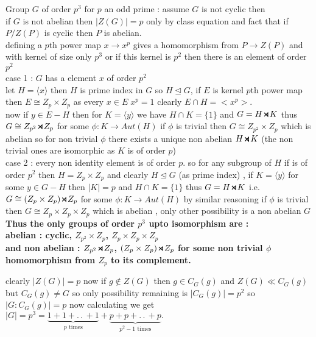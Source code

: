 \documentclass[11pt]{extarticle}
\newcommand{\ra}{\rightarrow}
\newcommand{\w}[1]{\text{#1}}
\newcommand{\ck}{.\,.\,}
\newcommand{\smdp}{ \,
\begin{tikzpicture}
	\draw[thick] (0,0)--(1ex,1ex)--(1ex,0)--(0,1ex);
\end{tikzpicture} 
\,
}
\newcommand{\gen}[1]{\langle #1 \rangle}
\newcommand{\tbx}[2][]{
	\begin{tcolorbox}[enhanced,breakable,size=small,colback=black!2!white,title={#1},arc is angular, arc=1.5mm,drop fuzzy shadow]
		#2
	\end{tcolorbox}
}
\begin{document}
\begin{multicols}{2}
	
	\tbx{ Group $ G $ of order $ p^3 $ for $ p $ an odd prime : 
		assume $ G $ is not cyclic then \\
		if $ G $ is not abelian then $ |Z(G)|=p $ only by class equation and fact that if $ P/Z(P) $ is cyclic then $ P $ is abelian.\\
		defining a $ p $th power map $ x\ra x^p $ gives a homomorphism from $ P\ra Z(P) $ and with kernel of size only $ p^3 $ or if this kernel is $ p^2 $ then there is an element of order $ p^2 $\\
		case 1 : $ G $ has a element $ x $ of order $ p^2 $ \\
		let $ H=\gen{x} $ then $ H $ is prime index in $ G $ so $ H \trianglelefteq G $, if $ E$ is kernel $  p$th power map then $ E \cong Z_p \times Z_p $ as every $ x\in E \; x^p=1$ clearly $ E \cap H =<x^p> .$\\
		now if $ y\in E-H $ then for $ K=\gen{y} $ we have $ H \cap K=\{1\} $ and $ G =H \smdp K $ thus 
		$ G \cong Z_{p^2} \smdp Z_p $ for some $ \phi : K \ra Aut(H) $ if $ \phi $ is trivial then $ G \cong Z_{p^2}\times Z_p $ which is abelian so for non trivial $ \phi $ there exists a unique non abelian $ H \smdp K $ (the non trivial ones are isomorphic as $ K $ is of order $ p $)\\
		case 2 : every non identity element is of order $ p .$
		so  for any subgroup of $ H $ if is of order $ p^2 $ then $ H=Z_p\times Z_p $ and clearly $ H \trianglelefteq G $ (as prime index) , if $ K=\gen{y} $ for some $ y\in G-H $ then $ |K|=p $ and $ H\cap K=\{1\} $ thus $ G=H\smdp K $ i.e. $ G \cong (Z_p\times Z_p)\smdp Z_p $ for some $ \phi : K \ra Aut(H) $ by similar reasoning if $ \phi  $ is trivial then $ G \cong Z_p\times Z_p\times Z_p $ which is abelian , only other possibility  is a non abelian $ G $\\
		\textbf{	Thus the only groups of order $ p^3 $ upto isomorphism are : \\
			abelian : cyclic, $ Z_{p^2}\times Z_p $,  $ Z_p\times Z_p\times Z_p $ \\
			and non abelian  : $Z_{p^2}\smdp Z_p $, $  (Z_p\times Z_p)\smdp Z_p  $ for some non trivial $ \phi  $ homomorphism from $ Z_p $ to its complement.}
	}
	\tbx[Class equation for group of order $ p^3 $]{ 
		clearly $ |Z(G)|=p $ now if $ g\not\in Z(G) $ then $ g\in C_G(g) $ and $ Z(G)\ll C_G(g) $ but $ C_G(g)\neq G $ so only possibility remaining is $ |C_G(g)|=p^2 $ so $ |G:C_G(g)|=p $ now calculating we get\\
		$ |G|=p^3=\underbrace{1+1+\ck+1}_{p \w{ times}} +\underbrace{p+p+\ck+p}_{p^2-1\w{ times}}.$}

\end{multicols}
\end{document}
